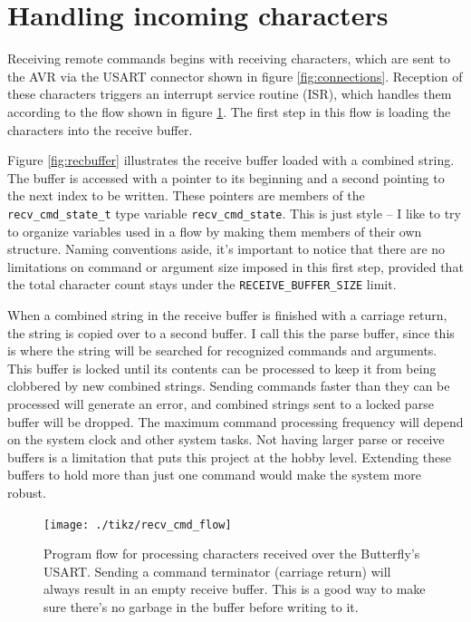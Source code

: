 \clearpage
\section{Handling incoming characters}
Receiving remote commands begins with receiving characters, which are sent to the AVR via the USART connector shown in figure \ref{fig:connections}.  Reception of these characters triggers an interrupt service routine (ISR), which handles them according to the flow shown in figure \ref{fig:recflow}. The first step in this flow is loading the characters into the receive buffer.

Figure \ref{fig:recbuffer} illustrates the receive buffer loaded with a combined string.  The buffer is accessed with a pointer to its beginning and a second pointing to the next index to be written.  These pointers are members of the \texttt{recv\_cmd\_state\_t} type variable \texttt{recv\_cmd\_state}.  This is just style -- I like to try to organize variables used in a flow by making them members of their own structure.  Naming conventions aside, it's important to notice that there are no limitations on command or argument size imposed in this first step, provided that the total character count stays under the \texttt{RECEIVE\_BUFFER\_SIZE} limit. 
 
When a combined string in the receive buffer is finished with a carriage return, the string is copied over to a second buffer.  I call this the parse buffer, since this is where the string will be searched for recognized commands and arguments.  This buffer is locked until its contents can be processed to keep it from being clobbered by new combined strings.  Sending commands faster than they can be processed will generate an error, and combined strings sent to a locked parse buffer will be dropped.  The maximum command processing frequency will depend on the system clock and other system tasks.  Not having larger parse or receive buffers is a limitation that puts this project at the hobby level.  Extending these buffers to hold more than just one command would make the system more robust.

\begin{figure}[ht]
    \begin{center}
        \texttt{[image: ./tikz/recv\_cmd\_flow]}
        \caption{Program flow for processing characters received over the Butterfly's USART.  Sending a command terminator (carriage return) will always result in an empty receive buffer.  This is a good way to make sure there's no garbage in the buffer before writing to it.\label{fig:recflow}}
    \end{center}
\end{figure}

